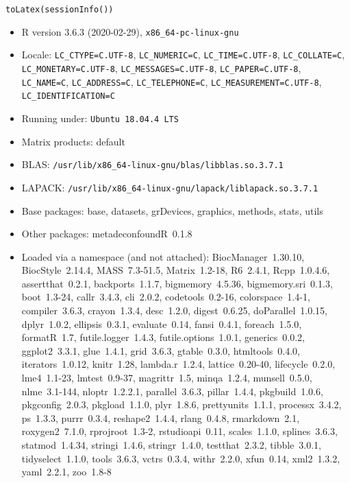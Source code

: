 \documentclass{article}\usepackage[]{graphicx}\usepackage[usenames,dvipsnames]{color}
\newcommand{\hlstd}[1]{\textcolor[rgb]{0.251,0.251,0.251}{#1}}%
\newcommand{\hlkwd}[1]{\textcolor[rgb]{0.878,0.439,0.125}{#1}}%
\begin{document}
\begin{kframe}
\begin{alltt}
\hlkwd{toLatex}\hlstd{(}\hlkwd{sessionInfo}\hlstd{())}
\end{alltt}
\end{kframe}\begin{itemize}\raggedright
  \item R version 3.6.3 (2020-02-29), \verb|x86_64-pc-linux-gnu|
  \item Locale: \verb|LC_CTYPE=C.UTF-8|, \verb|LC_NUMERIC=C|, \verb|LC_TIME=C.UTF-8|, \verb|LC_COLLATE=C|, \verb|LC_MONETARY=C.UTF-8|, \verb|LC_MESSAGES=C.UTF-8|, \verb|LC_PAPER=C.UTF-8|, \verb|LC_NAME=C|, \verb|LC_ADDRESS=C|, \verb|LC_TELEPHONE=C|, \verb|LC_MEASUREMENT=C.UTF-8|, \verb|LC_IDENTIFICATION=C|
  \item Running under: \verb|Ubuntu 18.04.4 LTS|
  \item Matrix products: default
  \item BLAS:   \verb|/usr/lib/x86_64-linux-gnu/blas/libblas.so.3.7.1|
  \item LAPACK: \verb|/usr/lib/x86_64-linux-gnu/lapack/liblapack.so.3.7.1|
  \item Base packages: base, datasets, grDevices, graphics, methods,
    stats, utils
  \item Other packages: metadeconfoundR~0.1.8
  \item Loaded via a namespace (and not attached):
    BiocManager~1.30.10, BiocStyle~2.14.4, MASS~7.3-51.5,
    Matrix~1.2-18, R6~2.4.1, Rcpp~1.0.4.6, assertthat~0.2.1,
    backports~1.1.7, bigmemory~4.5.36, bigmemory.sri~0.1.3,
    boot~1.3-24, callr~3.4.3, cli~2.0.2, codetools~0.2-16,
    colorspace~1.4-1, compiler~3.6.3, crayon~1.3.4, desc~1.2.0,
    digest~0.6.25, doParallel~1.0.15, dplyr~1.0.2, ellipsis~0.3.1,
    evaluate~0.14, fansi~0.4.1, foreach~1.5.0, formatR~1.7,
    futile.logger~1.4.3, futile.options~1.0.1, generics~0.0.2,
    ggplot2~3.3.1, glue~1.4.1, grid~3.6.3, gtable~0.3.0,
    htmltools~0.4.0, iterators~1.0.12, knitr~1.28, lambda.r~1.2.4,
    lattice~0.20-40, lifecycle~0.2.0, lme4~1.1-23, lmtest~0.9-37,
    magrittr~1.5, minqa~1.2.4, munsell~0.5.0, nlme~3.1-144,
    nloptr~1.2.2.1, parallel~3.6.3, pillar~1.4.4, pkgbuild~1.0.6,
    pkgconfig~2.0.3, pkgload~1.1.0, plyr~1.8.6, prettyunits~1.1.1,
    processx~3.4.2, ps~1.3.3, purrr~0.3.4, reshape2~1.4.4,
    rlang~0.4.8, rmarkdown~2.1, roxygen2~7.1.0, rprojroot~1.3-2,
    rstudioapi~0.11, scales~1.1.0, splines~3.6.3, statmod~1.4.34,
    stringi~1.4.6, stringr~1.4.0, testthat~2.3.2, tibble~3.0.1,
    tidyselect~1.1.0, tools~3.6.3, vctrs~0.3.4, withr~2.2.0,
    xfun~0.14, xml2~1.3.2, yaml~2.2.1, zoo~1.8-8
\end{itemize}
\end{document}
